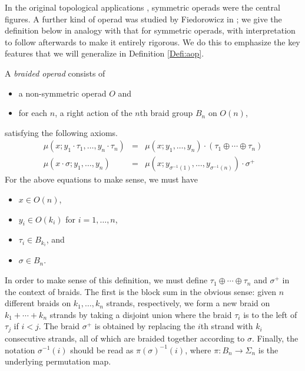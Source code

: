 \documentclass{amsbook} %
\numberwithin{section}{chapter}
\begin{document}
In the original topological applications \cite{maygeom}, symmetric operads were the central figures.  A further kind of operad was studied by Fiedorowicz in \cite{fie-br}; we give the definition below in analogy with that for symmetric operads, with interpretation to follow afterwards to make it entirely rigorous.  We do this to emphasize the key features that we will generalize in Definition \ref{Defi:aop}.

\begin{Defi}\label{broperad}
A \textit{braided operad} consists of
\begin{itemize}
\item a non-symmetric operad $O$ and
\item for each $n$, a right action of the $n$th braid group $B_{n}$ on $O(n)$,
\end{itemize}
satisfying the following axioms.
\[
\begin{array}{rcl}
\mu(x; y_{1} \cdot \tau_{1}, \ldots, y_{n} \cdot \tau_{n}) & = & \mu(x; y_{1}, \ldots, y_{n}) \cdot (\tau_{1} \oplus \cdots \oplus \tau_{n}) \\
\mu(x \cdot \sigma; y_{1}, \ldots, y_{n}) & =  & \mu(x; y_{\sigma^{-1}(1)}, \ldots, y_{\sigma^{-1}(n)}) \cdot \sigma^{+}
\end{array}
\]
For the above equations to make sense, we must have
\begin{itemize}
\item $x \in O(n)$,
\item $y_{i} \in O(k_{i})$ for $i=1, \ldots, n$,
\item $\tau_{i} \in B_{k_{i}}$, and
\item $\sigma \in B_{n}$.
\end{itemize}
\end{Defi}

In order to make sense of this definition, we must define $\tau_{1} \oplus \cdots \oplus \tau_{n}$ and $\sigma^{+}$ in the context of braids.  The first is the block sum in the obvious sense:  given $n$ different braids on $k_{1}, \ldots, k_{n}$ strands, respectively, we form a new braid on $k_{1} + \cdots + k_{n}$ strands by taking a disjoint union where the braid $\tau_{i}$ is to the left of $\tau_{j}$ if $i < j$.  The braid $\sigma^{+}$ is obtained by replacing the $i$th strand with $k_{i}$ consecutive strands, all of which are braided together according to $\sigma$.  Finally, the notation $\sigma^{-1}(i)$ should be read as $\pi(\sigma)^{-1}(i)$, where $\pi:B_{n} \rightarrow \Sigma_{n}$ is the underlying permutation map.
\end{document}
